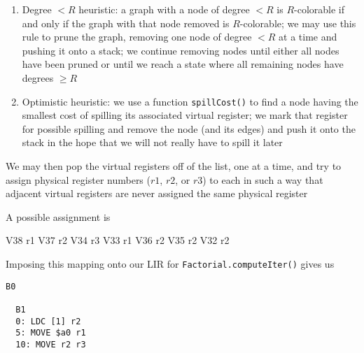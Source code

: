 \documentclass[8pt,a4paper,compress]{beamer}
\begin{document}
\begin{frame}[fragile]
\pause

\begin{enumerate}
\item Degree $< R$ heuristic: a graph with a node of degree $< R$ is $R$-colorable if and only if the graph with that node removed is $R$-colorable; we may use this rule to prune the graph, removing one node of degree $< R$ at a time and pushing it onto a stack; we continue removing nodes until either all nodes have been pruned or until we reach a state where all remaining nodes have degrees $\ge R$

\item Optimistic heuristic: we use a function \lstinline{spillCost()} to find a node having the smallest cost of spilling its associated virtual register; we mark that register for possible spilling and remove the node (and its edges) and push it onto the stack in the hope that we will not really have to spill it later
\end{enumerate}
\end{frame}

\begin{frame}[fragile]
\pause

Pruning of the above interference graph with $R = 3$ is shown below
\begin{center}
}
\end{center}
\end{frame}

\begin{frame}[fragile]
\pause

We may then pop the virtual registers off of the list, one at a time, and try to assign physical register numbers ($r1$, $r2$, or $r3$) to each in such a way that adjacent virtual registers are never assigned the same physical register

\pause
\bigskip

A possible assignment is
\begin{production}
    V38 r1
    V37 r2
    V34 r3
    V33 r1
    V36 r2
    V35 r2
    V32 r2
\end{production}

\pause

Imposing this mapping onto our LIR for \lstinline{Factorial.computeIter()} gives us
\begin{lstlisting}[language={},style=focusin]
  B0

  B1
  0: LDC [1] r2
  5: MOVE $a0 r1
  10: MOVE r2 r3

\end{lstlisting}
\end{frame}
\end{document}
